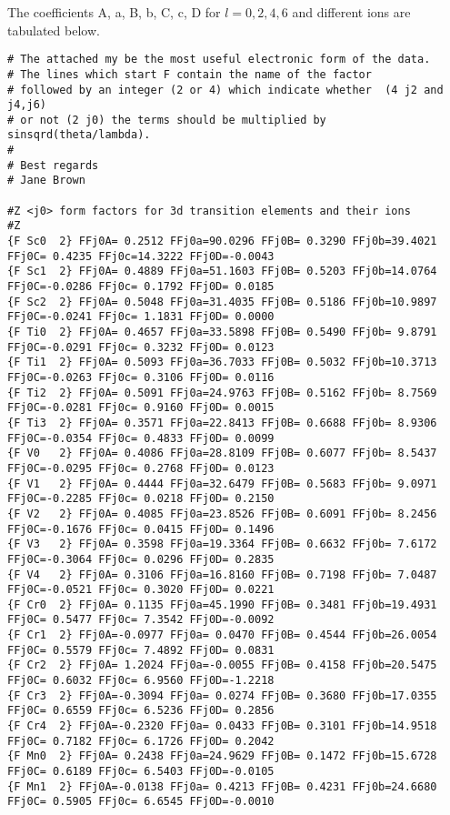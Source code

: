 The coefficients A, a, B, b, C, c, D for $l=0,2,4,6$ and different ions are tabulated below. 

{\footnotesize
\begin{verbatim}
# The attached my be the most useful electronic form of the data.
# The lines which start F contain the name of the factor
# followed by an integer (2 or 4) which indicate whether  (4 j2 and j4,j6)
# or not (2 j0) the terms should be multiplied by sinsqrd(theta/lambda).
#
# Best regards
# Jane Brown

#Z <j0> form factors for 3d transition elements and their ions
#Z
{F Sc0  2} FFj0A= 0.2512 FFj0a=90.0296 FFj0B= 0.3290 FFj0b=39.4021 FFj0C= 0.4235 FFj0c=14.3222 FFj0D=-0.0043 
{F Sc1  2} FFj0A= 0.4889 FFj0a=51.1603 FFj0B= 0.5203 FFj0b=14.0764 FFj0C=-0.0286 FFj0c= 0.1792 FFj0D= 0.0185 
{F Sc2  2} FFj0A= 0.5048 FFj0a=31.4035 FFj0B= 0.5186 FFj0b=10.9897 FFj0C=-0.0241 FFj0c= 1.1831 FFj0D= 0.0000 
{F Ti0  2} FFj0A= 0.4657 FFj0a=33.5898 FFj0B= 0.5490 FFj0b= 9.8791 FFj0C=-0.0291 FFj0c= 0.3232 FFj0D= 0.0123 
{F Ti1  2} FFj0A= 0.5093 FFj0a=36.7033 FFj0B= 0.5032 FFj0b=10.3713 FFj0C=-0.0263 FFj0c= 0.3106 FFj0D= 0.0116 
{F Ti2  2} FFj0A= 0.5091 FFj0a=24.9763 FFj0B= 0.5162 FFj0b= 8.7569 FFj0C=-0.0281 FFj0c= 0.9160 FFj0D= 0.0015 
{F Ti3  2} FFj0A= 0.3571 FFj0a=22.8413 FFj0B= 0.6688 FFj0b= 8.9306 FFj0C=-0.0354 FFj0c= 0.4833 FFj0D= 0.0099 
{F V0   2} FFj0A= 0.4086 FFj0a=28.8109 FFj0B= 0.6077 FFj0b= 8.5437 FFj0C=-0.0295 FFj0c= 0.2768 FFj0D= 0.0123 
{F V1   2} FFj0A= 0.4444 FFj0a=32.6479 FFj0B= 0.5683 FFj0b= 9.0971 FFj0C=-0.2285 FFj0c= 0.0218 FFj0D= 0.2150 
{F V2   2} FFj0A= 0.4085 FFj0a=23.8526 FFj0B= 0.6091 FFj0b= 8.2456 FFj0C=-0.1676 FFj0c= 0.0415 FFj0D= 0.1496 
{F V3   2} FFj0A= 0.3598 FFj0a=19.3364 FFj0B= 0.6632 FFj0b= 7.6172 FFj0C=-0.3064 FFj0c= 0.0296 FFj0D= 0.2835 
{F V4   2} FFj0A= 0.3106 FFj0a=16.8160 FFj0B= 0.7198 FFj0b= 7.0487 FFj0C=-0.0521 FFj0c= 0.3020 FFj0D= 0.0221 
{F Cr0  2} FFj0A= 0.1135 FFj0a=45.1990 FFj0B= 0.3481 FFj0b=19.4931 FFj0C= 0.5477 FFj0c= 7.3542 FFj0D=-0.0092 
{F Cr1  2} FFj0A=-0.0977 FFj0a= 0.0470 FFj0B= 0.4544 FFj0b=26.0054 FFj0C= 0.5579 FFj0c= 7.4892 FFj0D= 0.0831 
{F Cr2  2} FFj0A= 1.2024 FFj0a=-0.0055 FFj0B= 0.4158 FFj0b=20.5475 FFj0C= 0.6032 FFj0c= 6.9560 FFj0D=-1.2218 
{F Cr3  2} FFj0A=-0.3094 FFj0a= 0.0274 FFj0B= 0.3680 FFj0b=17.0355 FFj0C= 0.6559 FFj0c= 6.5236 FFj0D= 0.2856 
{F Cr4  2} FFj0A=-0.2320 FFj0a= 0.0433 FFj0B= 0.3101 FFj0b=14.9518 FFj0C= 0.7182 FFj0c= 6.1726 FFj0D= 0.2042 
{F Mn0  2} FFj0A= 0.2438 FFj0a=24.9629 FFj0B= 0.1472 FFj0b=15.6728 FFj0C= 0.6189 FFj0c= 6.5403 FFj0D=-0.0105 
{F Mn1  2} FFj0A=-0.0138 FFj0a= 0.4213 FFj0B= 0.4231 FFj0b=24.6680 FFj0C= 0.5905 FFj0c= 6.6545 FFj0D=-0.0010 

\end{verbatim}}
